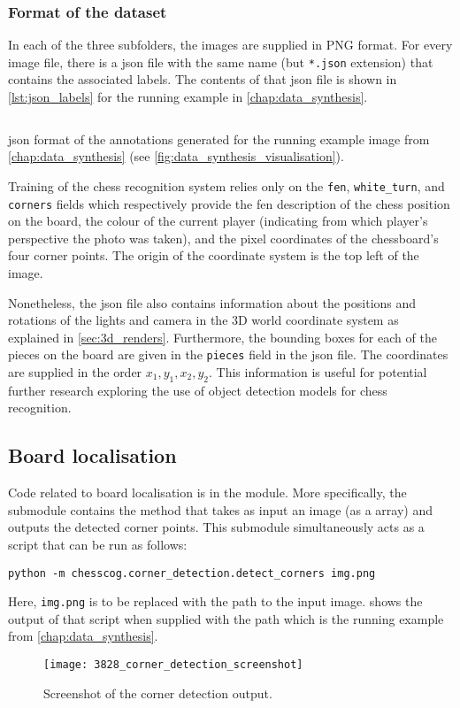 \documentclass[../../report.tex]{subfiles}
\begin{document}
\subsubsection{Format of the dataset}
In each of the three subfolders, the images are supplied in PNG format.
For every image file, there is a \gls{json} file with the same name (but \texttt{*.json} extension) that contains the associated labels.
The contents of that \gls{json} file is shown in \cref{lst:json_labels} for the running example in \cref{chap:data_synthesis}.
\begin{listing}
    \inputminted{json}{\subfix{../../data/3828.json}}
    \caption[\acs{json} format of the annotations generated for the running example image from \cref{chap:data_synthesis}.]{\acs{json} format of the annotations generated for the running example image from \cref{chap:data_synthesis} (see \cref{fig:data_synthesis_visualisation}).}
    \label{fig:json_labels}
\end{listing}
Training of the chess recognition system relies only on the \texttt{fen}, \texttt{white\_turn}, and \texttt{corners} fields which respectively provide the \gls{fen} description of the chess position on the board, the colour of the current player (indicating from which player's perspective the photo was taken), and the pixel coordinates of the chessboard's four corner points.
The origin of the coordinate system is the top left of the image.

Nonetheless, the \gls{json} file also contains information about the positions and rotations of the lights and camera in the 3D world coordinate system as explained in \cref{sec:3d_renders}.
Furthermore, the bounding boxes for each of the pieces on the board are given in the \texttt{pieces} field in the \gls{json} file.
The coordinates are supplied in the order $x_1,y_1,x_2,y_2$.
This information is useful for potential further research exploring the use of object detection models for chess recognition.

\subsection{Board localisation}
Code related to board localisation is in the  module.
More specifically, the  submodule contains the  method that takes as input an image (as a  array) and outputs the detected corner points.
This submodule simultaneously acts as a script that can be run as follows:
\begin{verbatim}
python -m chesscog.corner_detection.detect_corners img.png
\end{verbatim}
Here, \texttt{img.png} is to be replaced with the path to the input image.
 shows the output of that script when supplied with the path  which is the running example from \cref{chap:data_synthesis}.
\begin{figure}
    \centering
    \texttt{[image: 3828\_corner\_detection\_screenshot]}
    \caption{Screenshot of the corner detection output.}
    \label{fig:example_detect_corners}
\end{figure}
\end{document}
